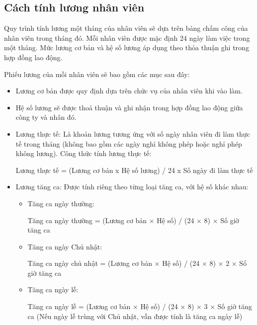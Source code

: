 \documentclass[a4paper,12pt]{report}
\begin{document}
\subsection{Cách tính lương nhân viên}
\quad Quy trình tính lương một tháng của nhân viên sẽ dựa trên bảng chấm công của nhân viên trong tháng đó. Mỗi nhân viên được mặc định 24 ngày làm việc trong một tháng. Mức lương cơ bản và hệ số lương áp dụng theo thỏa thuận ghi trong hợp đồng lao động.

\quad Phiếu lương của mỗi nhân viên sẽ bao gồm các mục sau đây:
\begin{itemize}
    \item Lương cơ bản được quy định dựa trên chức vụ của nhân viên khi vào làm.
    \item Hệ số lương sẽ được thoả thuận và ghi nhận trong hợp đồng lao động giữa công ty và nhân đó.
    \item Lương thực tế: Là khoản lương tương ứng với số ngày nhân viên đi làm thực tế trong tháng (không bao gồm các ngày nghỉ không phép hoặc nghỉ phép không lương). \newline
            Công thức tính lương thực tế:
            \begin{center}
                \small
                Lương thực tế = (Lương cơ bản x Hệ số lương) / 24 x Số ngày đi làm thực tế
            \end{center} 
    \item Lương tăng ca: Được tính riêng theo từng loại tăng ca, với hệ số khác nhau:
    \begin{itemize}
        \item Tăng ca ngày thường:
        \begin{center}
            \small
            Tăng ca ngày thường = (Lương cơ bản × Hệ số) / (24 × 8) × Số giờ tăng ca
        \end{center}
        \item Tăng ca ngày Chủ nhật:
        \begin{center}
            \small
            Tăng ca ngày chủ nhật = (Lương cơ bản × Hệ số) / (24 × 8) × 2 × Số giờ tăng ca
        \end{center}
        \item Tăng ca ngày lễ:
        \begin{center}
            \small
            Tăng ca ngày lễ = (Lương cơ bản × Hệ số) / (24 × 8) × 3 × Số giờ tăng ca \newline
        (Nếu ngày lễ trùng với Chủ nhật, vẫn được tính là tăng ca ngày lễ)
        \end{center}

\end{itemize}
\end{itemize}
\end{document}
